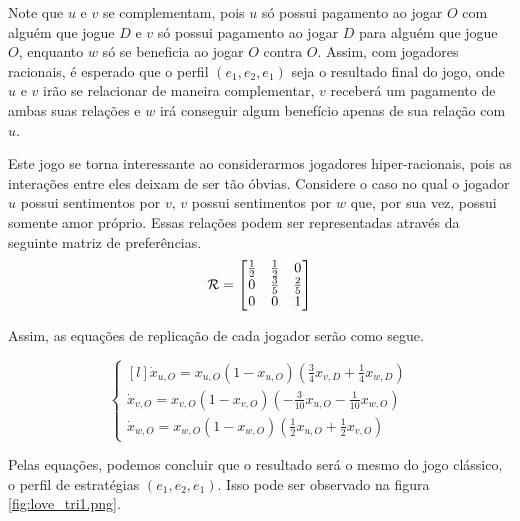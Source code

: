 Note que $u$ e $v$ se complementam, pois $u$ só possui pagamento ao jogar $O$ com alguém que jogue $D$ e $v$ só possui pagamento ao jogar $D$ para alguém que jogue $O$, enquanto $w$ só se beneficia ao jogar $O$ contra $O$. Assim, com jogadores racionais, é esperado que o perfil $(e_1,e_2,e_1)$ seja o resultado final do jogo, onde $u$ e $v$ irão se relacionar de maneira complementar, $v$ receberá um pagamento de ambas suas relações e $w$ irá conseguir algum benefício apenas de sua relação com $u$.

Este jogo se torna interessante ao considerarmos jogadores hiper-racionais, pois as interações entre eles deixam de ser tão óbvias. Considere o caso no qual o jogador $u$ possui sentimentos por $v$, $v$ possui sentimentos por $w$ que, por sua vez, possui somente amor próprio. Essas relações podem ser representadas através da seguinte matriz de preferências.
\begin{equation}
    \label{prefPosLoveTri1}
    \mathcal{R}=
    \begin{bmatrix}
        \frac{1}{2} & \frac{1}{2} & 0\\ 
        0 & \frac{3}{5} & \frac{2}{5} \\
        0 & 0 & 1
    \end{bmatrix}
\end{equation}

Assim, as equações de replicação de cada jogador serão como segue.

\begin{equation}
    \label{EqRepLoveTri1}
    \left\{\begin{matrix*}[l]
        \dot{x}_{u,O}=x_{u,O}(1-x_{u,O})\left(\frac{3}{4}x_{v,D}+\frac{1}{4}x_{w,D}\right) \\
        \dot{x}_{v,O}=x_{v,O}(1-x_{v,O})\left(-\frac{3}{10}x_{u,O}-\frac{1}{10}x_{w,O}\right) \\
        \dot{x}_{w,O}=x_{w,O}(1-x_{w,O})\left(\frac{1}{2}x_{u,O}+\frac{1}{2}x_{v,O}\right)
    \end{matrix*}\right.
\end{equation}

Pelas equações, podemos concluir que o resultado será o mesmo do jogo clássico, o perfil de estratégias $(e_1,e_2,e_1)$. Isso pode ser observado na figura \ref{fig:love_tri1.png}.

